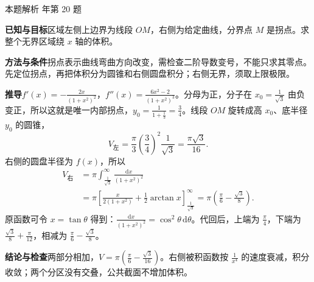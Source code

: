 \documentclass[UTF8,zihao=-4,fontset=fandol]{ctexart}
\newenvironment{QuestionSolution}[1]{%
  \clearpage
  {\small\textcolor{black!60}{本题解析\quad #1}}\par\medskip
}{\par\clearpage}
\begin{document}
\begin{QuestionSolution}{2026 年第 20 题}
\textbf{已知与目标}\quad 区域左侧上边界为线段 \(OM\)，右侧为给定曲线，分界点 \(M\) 是拐点。求整个无界区域绕 \(x\) 轴的体积。

\textbf{方法与条件}\quad 拐点表示曲线弯曲方向改变，需检查二阶导数变号，不能只求其零点。先定位拐点，再把体积分为圆锥和右侧圆盘积分；右侧无界，须取上限极限。

\textbf{推导}\quad \(f'(x)=-\frac{2x}{(1+x^2)^2}\)，\(f''(x)=\frac{6x^2-2}{(1+x^2)^3}\)。分母为正，分子在 \(x_0=\frac{1}{\sqrt3}\) 由负变正，所以这就是唯一内部拐点，\(y_0=\frac{1}{1+\frac{1}{3}}=\frac{3}{4}\)。线段 \(OM\) 旋转成高 \(x_0\)、底半径 \(y_0\) 的圆锥，
\[
V_{\text{左}}=\frac{\pi}{3}\left(\frac{3}{4}\right)^2\frac{1}{\sqrt3}
=\frac{\pi\sqrt3}{16}.
\]
右侧的圆盘半径为 \(f(x)\)，所以
\[
\begin{aligned}
V_{\text{右}}
&=\pi\int_{\frac{1}{\sqrt3}}^\infty\frac{\mathrm{d}x}{(1+x^2)^2}\\
&=\pi\left[\frac{x}{2(1+x^2)}+\frac12\arctan x\right]_{\frac{1}{\sqrt3}}^\infty
=\pi\left(\frac\pi6-\frac{\sqrt3}{8}\right).
\end{aligned}
\]
原函数可令 \(x=\tan\theta\) 得到：\(\frac{\mathrm{d}x}{(1+x^2)^2}=\cos^2\theta\,\mathrm{d}\theta\)。代回后，上端为 \(\frac{\pi}{4}\)，下端为 \(\frac{\sqrt3}{8}+\frac{\pi}{12}\)，相减为 \(\frac{\pi}{6}-\frac{\sqrt3}{8}\)。

\textbf{结论与检查}\quad 两部分相加，\(\boxed{V=\pi(\frac{\pi}{6}-\frac{\sqrt3}{16})}\)。右侧被积函数按 \(\frac{1}{x^4}\) 的速度衰减，积分收敛；两个分区没有交叠，公共截面不增加体积。
\end{QuestionSolution}
\end{document}
